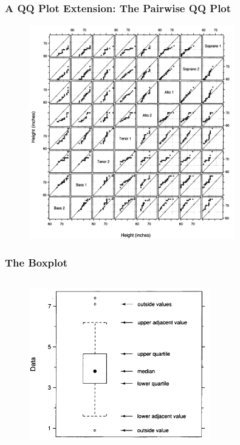 \documentclass[aspectratio=1610]{beamer}
\begin{document}
\begin{frame}
	\frametitle{A QQ Plot Extension: The Pairwise QQ Plot}
	\begin{figure}
		\begin{center}
			\includegraphics[width=0.8\textwidth]{figures/pairwise_qq_plot.png}
		\end{center}
	\end{figure}
\end{frame}

\begin{frame}
	\frametitle{The Boxplot}
	\begin{columns}
		\begin{figure}
			\begin{center}
				\includegraphics[width=0.7\textwidth]{figures/boxplot.png}
			\end{center}
		\end{figure}
	\end{columns}
\end{frame}
\end{document}
